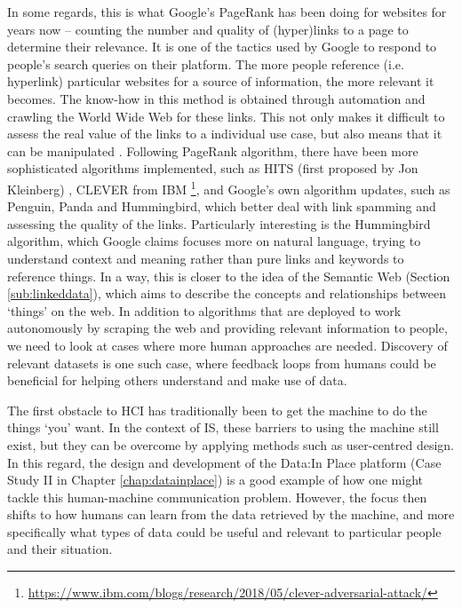 In some regards, this is what Google's PageRank has been doing for websites for years now -- counting the number and quality of (hyper)links to a page to determine their relevance. It is one of the tactics used by Google to respond to people's search queries on their platform. The more people reference (i.e. hyperlink) particular websites for a source of information, the more relevant it becomes. The know-how in this method is obtained through automation and crawling the World Wide Web for these links. This not only makes it difficult to assess the real value of the links to a individual use case, but also means that it can be manipulated \citep{gyongyi_link_2006}. Following PageRank algorithm, there have been more sophisticated algorithms implemented, such as HITS (first proposed by Jon Kleinberg) \citep{kleinberg_hubs_1999}, CLEVER from IBM \footnote{\url{https://www.ibm.com/blogs/research/2018/05/clever-adversarial-attack/}}, and Google's own algorithm updates, such as Penguin, Panda and Hummingbird, which better deal with link spamming and assessing the quality of the links. Particularly interesting is the Hummingbird algorithm, which Google claims focuses more on natural language, trying to understand context and meaning rather than pure links and keywords to reference things. In a way, this is closer to the idea of the Semantic Web (Section \ref{sub:linkeddata}), which aims to describe the concepts and relationships between `things' on the web. In addition to algorithms that are deployed to work autonomously by scraping the web and providing relevant information to people, we need to look at cases where more human approaches are needed. Discovery of relevant datasets is one such case, where feedback loops from humans could be beneficial for helping others understand and make use of data.

The first obstacle to HCI has traditionally been to get the machine to do the things `you' want. In the context of IS, these barriers to using the machine still exist, but they can be overcome by applying methods such as user-centred design. In this regard, the design and development of the Data:In Place platform (Case Study II in Chapter \ref{chap:datainplace}) is a good example of how one might tackle this human-machine communication problem. However, the focus then shifts to how humans can learn from the data retrieved by the machine, and more specifically what types of data could be useful and relevant to particular people and their situation.

